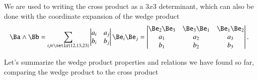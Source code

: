 We are used to writing the cross product as a \( 3 x 3 \) determinant, which can also be done with the coordinate expansion of the
 wedge product
\begin{equation}\label{eqn:products:1740}
\Ba \wedge \Bb
=
\sum_{ ij \in \setlr{ 12, 13, 23 } }
\begin{vmatrix}
a_i & a_j \\
b_i & b_j
\end{vmatrix}
\Be_i \Be_j
=
\begin{vmatrix}
\Be_2 \Be_3 & \Be_3 \Be_1 & \Be_1 \Be_2 \\
a_1 & a_2 & a_3 \\
b_1 & b_2 & b_3 \\
\end{vmatrix}.
\end{equation}

Let's summarize the wedge product properties and relations we have found so far, comparing the  wedge product to the cross product


